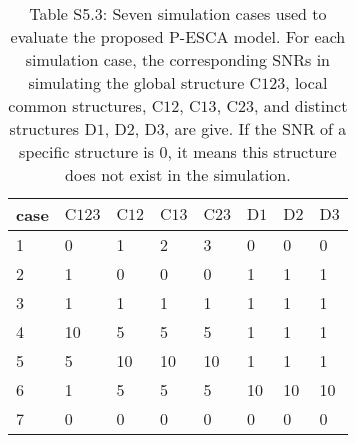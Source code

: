 \begin{table}[htbp]
\centering
\caption*{Table S5.3: Seven simulation cases used to evaluate the proposed P-ESCA model. For each simulation case, the corresponding SNRs in simulating the global structure $\text{C123}$, local common structures, $\text{C12}$, $\text{C13}$, $\text{C23}$, and distinct structures $\text{D1}$, $\text{D2}$, $\text{D3}$, are give. If the SNR of a specific structure is 0, it means this structure does not exist in the simulation.}
\label{chapter5_tab:S3}
\begin{tabular}{llllllll}
  \toprule
case & $\text{C123}$ & $\text{C12}$ & $\text{C13}$ & $\text{C23}$ & $\text{D1}$ & $\text{D2}$ & $\text{D3}$ \\
  \midrule
 1   & 0  & 1  & 2  & 3   & 0  & 0  & 0   \\
 2   & 1  & 0  & 0  & 0   & 1  & 1  & 1   \\
 3   & 1  & 1  & 1  & 1   & 1  & 1  & 1   \\
 4   & 10 & 5  & 5  & 5   & 1  & 1  & 1   \\
 5   & 5  & 10 & 10 & 10  & 1  & 1  & 1   \\
 6   & 1  & 5  & 5  & 5   & 10 & 10 & 10   \\
 7   & 0  &  0 & 0  & 0   & 0  & 0  & 0   \\
  \bottomrule
\end{tabular}
\end{table}

